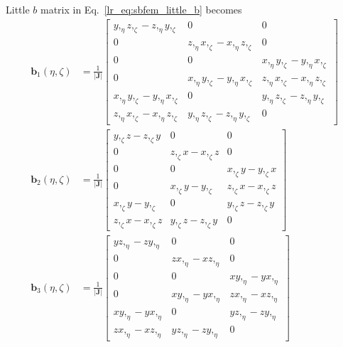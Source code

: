 %
Little $b$ matrix in Eq.~\ref{lr_eq:sbfem_little_b} becomes
\begin{subequations}
\begin{align}
    \mathbf{b}_1 (\eta, \zeta) &= \frac{1}{|\mathbf{J}|}
    \begin{bmatrix}
        y,_{\eta} z,_{\zeta} - z,_{\eta} y,_{\zeta} & 0 & 0 \\
        0 & z,_{\eta} x,_{\zeta} - x,_{\eta} z,_{\zeta} & 0 \\
        0 & 0 & x,_{\eta} y,_{\zeta} - y,_{\eta} x,_{\zeta} \\
        0 & x,_{\eta} y,_{\zeta} - y,_{\eta} x,_{\zeta} & z,_{\eta} x,_{\zeta} - x,_{\eta} z,_{\zeta} \\
        x,_{\eta} y,_{\zeta} - y,_{\eta} x,_{\zeta} & 0 & y,_{\eta} z,_{\zeta} - z,_{\eta} y,_{\zeta} \\
        z,_{\eta} x,_{\zeta} - x,_{\eta} z,_{\zeta} & y,_{\eta} z,_{\zeta} - z,_{\eta} y,_{\zeta} & 0
    \end{bmatrix} \\
    \mathbf{b}_2 (\eta, \zeta) &= \frac{1}{|\mathbf{J}|}
    \begin{bmatrix}
        y,_{\zeta} z - z,_{\zeta} y & 0 & 0 \\
        0 & z,_{\zeta} x - x,_{\zeta} z & 0 \\
        0 & 0 & x,_{\zeta} y - y,_{\zeta} x \\
        0 & x,_{\zeta} y - y,_{\zeta} & z,_{\zeta} x - x,_{\zeta} z \\
        x,_{\zeta} y - y,_{\zeta} & 0 & y,_{\zeta} z - z,_{\zeta} y \\
        z,_{\zeta} x - x,_{\zeta} z & y,_{\zeta} z - z,_{\zeta} y & 0
    \end{bmatrix} \\
    \mathbf{b}_3 (\eta, \zeta) &= \frac{1}{|\mathbf{J}|}
    \begin{bmatrix}
        y z,_{\eta} - z y,_{\eta} & 0 & 0 \\
        0 & z x,_{\eta} - x z,_{\eta} & 0 \\
        0 & 0 & x y,_{\eta} - y x,_{\eta} \\
        0 & x y,_{\eta} - y x,_{\eta} & z x,_{\eta} - x z,_{\eta} \\
        x y,_{\eta} - y x,_{\eta} & 0 & y z,_{\eta} - z y,_{\eta} \\
        z x,_{\eta} - x z,_{\eta} & y z,_{\eta} - z y,_{\eta} & 0
    \end{bmatrix}
\end{align}
\end{subequations}
